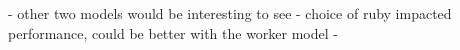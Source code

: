 
- other two models would be interesting to see
- choice of ruby impacted performance, could be better with the worker model
-
